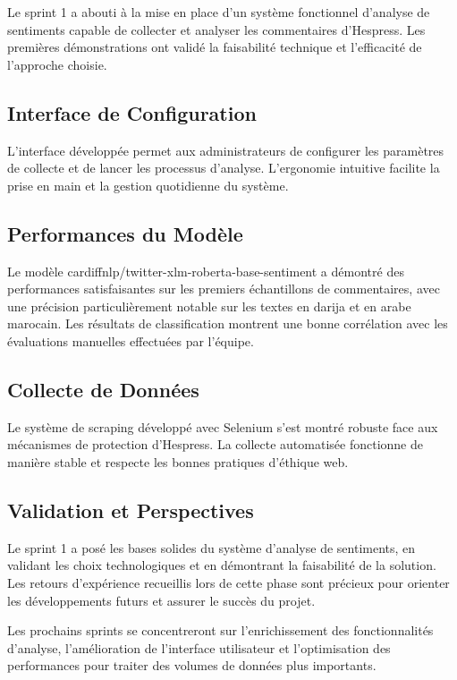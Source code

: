 Le sprint 1 a abouti à la mise en place d'un système fonctionnel d'analyse de sentiments capable de collecter et analyser les commentaires d'Hespress. Les premières démonstrations ont validé la faisabilité technique et l'efficacité de l'approche choisie.

\subsection{Interface de Configuration}

L'interface développée permet aux administrateurs de configurer les paramètres de collecte et de lancer les processus d'analyse. L'ergonomie intuitive facilite la prise en main et la gestion quotidienne du système.

\subsection{Performances du Modèle}

Le modèle cardiffnlp/twitter-xlm-roberta-base-sentiment a démontré des performances satisfaisantes sur les premiers échantillons de commentaires, avec une précision particulièrement notable sur les textes en darija et en arabe marocain. Les résultats de classification montrent une bonne corrélation avec les évaluations manuelles effectuées par l'équipe.

\subsection{Collecte de Données}

Le système de scraping développé avec Selenium s'est montré robuste face aux mécanismes de protection d'Hespress. La collecte automatisée fonctionne de manière stable et respecte les bonnes pratiques d'éthique web.

\subsection{Validation et Perspectives}

Le sprint 1 a posé les bases solides du système d'analyse de sentiments, en validant les choix technologiques et en démontrant la faisabilité de la solution. Les retours d'expérience recueillis lors de cette phase sont précieux pour orienter les développements futurs et assurer le succès du projet.

Les prochains sprints se concentreront sur l'enrichissement des fonctionnalités d'analyse, l'amélioration de l'interface utilisateur et l'optimisation des performances pour traiter des volumes de données plus importants.